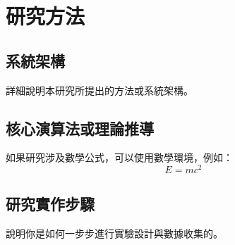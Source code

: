 \chapter{研究方法}
\label{cha:CH3-Method} 

\section{系統架構}
詳細說明本研究所提出的方法或系統架構。

\section{核心演算法或理論推導}
如果研究涉及數學公式，可以使用數學環境，例如：
\begin{equation}
    E = mc^2
    \label{equ:method_equ}
\end{equation}

\section{研究實作步驟}
說明你是如何一步步進行實驗設計與數據收集的。